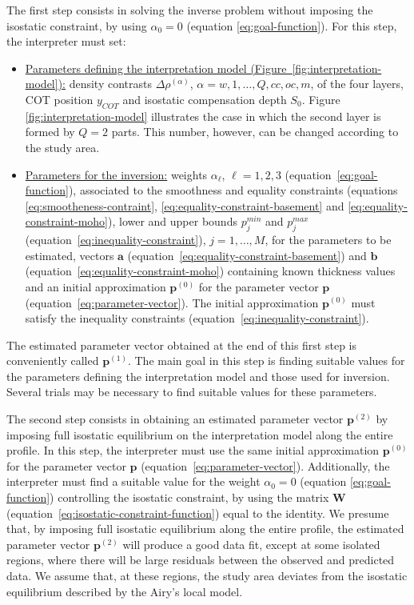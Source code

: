 \documentclass[manuscript]{geophysics}
\begin{document}
The first step consists in solving the inverse problem without imposing the isostatic
constraint, by using $\alpha_{0} = 0$ (equation \ref{eq:goal-function}). For this step,
the interpreter must set:
\begin{itemize}
	\item \underline{Parameters defining the interpretation model
	(Figure~\ref{fig:interpretation-model}):} density contrasts $\Delta \rho^{(\alpha)}$, 
	$\alpha = w, 1, \dots, Q, cc, oc, m$, of the four layers, COT position $y_{COT}$ and
	isostatic compensation depth $S_{0}$. Figure \ref{fig:interpretation-model} illustrates 
	the case in which the second layer is formed by $Q = 2$ parts. This number, however, 
	can be changed according to the study area.
	\item \underline{Parameters for the inversion:} weights $\alpha_{\ell}$,
	$\ell = 1, 2, 3$ (equation~\ref{eq:goal-function}), associated to the 
	smoothness and equality constraints (equations \ref{eq:smootheness-contraint},
	\ref{eq:equality-constraint-basement} and \ref{eq:equality-constraint-moho}),
	lower and upper bounds $p_{j}^{min}$ and $p_{j}^{max}$
	(equation~\ref{eq:inequality-constraint}), $j = 1, \dots, M$,
	for the parameters to be estimated, vectors $\mathbf{a}$ 
	(equation~\ref{eq:equality-constraint-basement}) and $\mathbf{b}$
	(equation~\ref{eq:equality-constraint-moho}) containing known thickness values
	and an initial approximation $\mathbf{p}^{(0)}$ for the parameter vector $\mathbf{p}$
	(equation~\ref{eq:parameter-vector}). The initial approximation $\mathbf{p}^{(0)}$
	must satisfy the inequality constraints (equation~\ref{eq:inequality-constraint}).
\end{itemize}
The estimated parameter vector obtained at the end of this first step is conveniently called
$\mathbf{p}^{(1)}$. The main goal in this step is finding suitable values for the parameters
defining the interpretation model and those used for inversion. Several trials may be
necessary to find suitable values for these parameters. 

The second step consists in obtaining an estimated parameter vector $\mathbf{p}^{(2)}$
by imposing full isostatic equilibrium on the interpretation model along the entire profile.
In this step, the interpreter must use the same initial approximation $\mathbf{p}^{(0)}$
for the parameter vector $\mathbf{p}$ (equation~\ref{eq:parameter-vector}). 
Additionally, the interpreter must find a suitable 
value for the weight $\alpha_{0} = 0$ (equation \ref{eq:goal-function}) controlling the 
isostatic constraint, by using the matrix $\mathbf{W}$
(equation~\ref{eq:isostatic-constraint-function}) equal to the identity.
We presume that, by imposing full isostatic equilibrium along the entire profile,
the estimated parameter vector $\mathbf{p}^{(2)}$ will produce a good data fit,
except at some isolated regions, where there will be large residuals between the
observed and predicted data. We assume that, at these regions, the study area deviates
from the isostatic equilibrium described by the Airy's local model.
\end{document}

